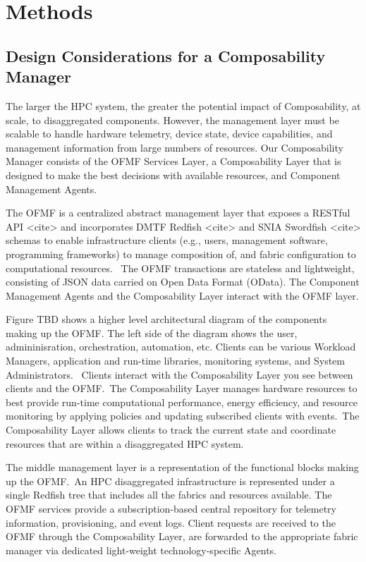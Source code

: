\section{Methods}

\subsection{Design Considerations for a Composability Manager}

The larger the HPC system, the greater the potential impact of Composability, at scale, to disaggregated components.  However, the management layer must be scalable to handle hardware telemetry, device state, device capabilities, and management information from large numbers of resources. Our Composability Manager consists of the OFMF Services Layer, a Composability Layer that is designed to make the best decisions with available resources, and Component Management Agents.

The OFMF is a centralized abstract management layer that exposes a RESTful API <cite> and incorporates DMTF Redfish <cite> and SNIA Swordfish <cite> schemas to enable infrastructure clients (e.g., users, management software, programming frameworks) to manage composition of, and fabric configuration to computational resources.  The OFMF transactions are stateless and lightweight, consisting of JSON data carried on Open Data Format (OData).  The Component Management Agents and the Composability Layer interact with the OFMF layer.

Figure TBD shows a higher level architectural diagram of the components making up the OFMF.  The left side of the diagram shows the user, admininisration, orchestration, automation, etc. Clients can be various Workload Managers, application and run-time libraries, monitoring systems, and System Administrators.  Clients interact with the Composability Layer you see between clients and the OFMF. The Composability Layer manages hardware resources to best provide run-time computational performance, energy efficiency, and resource monitoring by applying policies and updating subscribed clients with events. The Composability Layer allows clients to track the current state and coordinate resources that are within a disaggregated HPC system.  

The middle management layer is a representation of the functional blocks making up the OFMF. An HPC disaggregated infrastructure is represented under a single Redfish tree that includes all the fabrics and resources available. The OFMF services provide a subscription-based central repository for telemetry information, provisioning, and event logs.  Client requests are received to the OFMF through the Composability Layer, are forwarded to the appropriate fabric manager via dedicated light-weight technology-specific Agents. 

